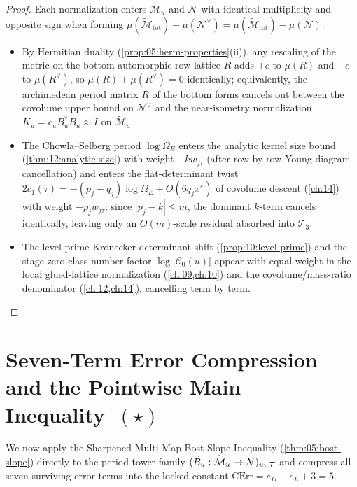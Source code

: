 \begin{proof}
Each normalization enters $\mathcal{M}_u$ and $\mathcal{N}$ with identical multiplicity and opposite sign when forming $\mu(\widetilde{\mathcal{M}}_{\mathrm{tot}}) + \mu(\mathcal{N}^\vee) = \mu(\widetilde{\mathcal{M}}_{\mathrm{tot}}) - \mu(\mathcal{N})$:
\begin{itemize}
\item By Hermitian duality (\cref{prop:05:herm-properties}(ii)), any rescaling of the metric on the bottom automorphic row lattice $R$ adds $+c$ to $\mu(R)$ and $-c$ to $\mu(R^\vee)$, so $\mu(R) + \mu(R^\vee) = 0$ identically; equivalently, the archimedean period matrix $R$ of the bottom forms cancels out between the covolume upper bound on $\mathcal{N}^\vee$ and the near-isometry normalization $K_u = c_u B_u^* B_u \approx I$ on $\widetilde{\mathcal{M}}_u$.
\item The Chowla--Selberg period $\log\Omega_E$ enters the analytic kernel size bound (\cref{thm:12:analytic-size}) with weight $+k w_{j\tau}$ (after row-by-row Young-diagram cancellation) and enters the flat-determinant twist $2c_1(\tau) = -(p_j - q_j)\log\Omega_E + O(6q_j x^\varepsilon)$ of covolume descent (\cref{ch:14}) with weight $-p_j w_{j\tau}$; since $|p_j - k| \le m$, the dominant $k$-term cancels identically, leaving only an $O(m)$-scale residual absorbed into $\mathcal{T}_3$.
\item The level-prime Kronecker-determinant shift (\cref{prop:10:level-prime}) and the stage-zero class-number factor $\log|\mathcal{C}_0(u)|$ appear with equal weight in the local glued-lattice normalization (\cref{ch:09,ch:10}) and the covolume/mass-ratio denominator (\cref{ch:12,ch:14}), cancelling term by term.
\end{itemize}
\end{proof}

\section{Seven-Term Error Compression and the Pointwise Main Inequality~$(\star)$}
\label{sec:06:main-ineq}

We now apply the Sharpened Multi-Map Bost Slope Inequality (\cref{thm:05:bost-slope}) directly to the period-tower family $(\widetilde{B}_u : \widetilde{\mathcal{M}}_u \to \mathcal{N})_{u \in \mathcal{T}}$ and compress all seven surviving error terms into the locked constant $\mathrm{CErr} = e_D + e_L + 3 = 5$.


